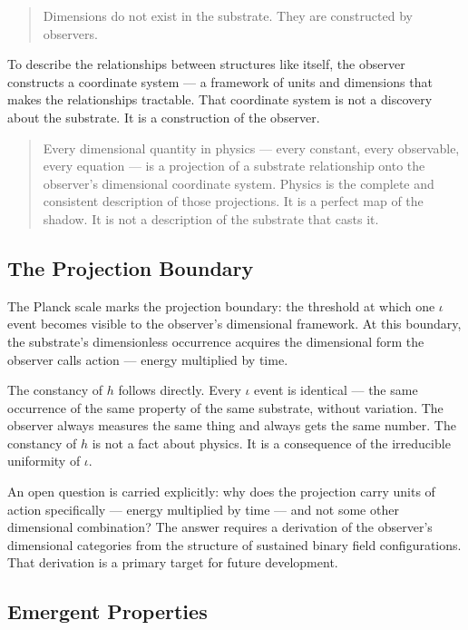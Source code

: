 \documentclass[11pt,letterpaper]{article}
\begin{document}
\begin{quote}
Dimensions do not exist in the substrate. They are constructed by observers.
\end{quote}

To describe the relationships between structures like itself, the observer constructs a coordinate system --- a framework of units and dimensions that makes the relationships tractable. That coordinate system is not a discovery about the substrate. It is a construction of the observer.

\begin{quote}
Every dimensional quantity in physics --- every constant, every observable, every equation --- is a projection of a substrate relationship onto the observer's dimensional coordinate system. Physics is the complete and consistent description of those projections. It is a perfect map of the shadow. It is not a description of the substrate that casts it.
\end{quote}
\subsection{The Projection Boundary}
\label{sec:org5ea595c}

The Planck scale marks the projection boundary: the threshold at which one \(\iota\) event becomes visible to the observer's dimensional framework. At this boundary, the substrate's dimensionless occurrence acquires the dimensional form the observer calls action --- energy multiplied by time.

The constancy of \(h\) follows directly. Every \(\iota\) event is identical --- the same occurrence of the same property of the same substrate, without variation. The observer always measures the same thing and always gets the same number. The constancy of \(h\) is not a fact about physics. It is a consequence of the irreducible uniformity of \(\iota\).

An open question is carried explicitly: why does the projection carry units of action specifically --- energy multiplied by time --- and not some other dimensional combination? The answer requires a derivation of the observer's dimensional categories from the structure of sustained binary field configurations. That derivation is a primary target for future development.
\subsection{Emergent Properties}
\label{sec:orgf7e5841}
\end{document}
